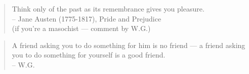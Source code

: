 \begin{verse}
Think only of the past as its remembrance gives you pleasure.\\
-- Jane Austen (1775-1817), Pride and Prejudice\\
(if you're a masochist --- comment by W.G.)  
\end{verse}

\begin{verse}
A friend asking you to do something for him is no friend --- a friend asking you to do something for yourself is a good friend.\\
-- W.G.
\end{verse}

